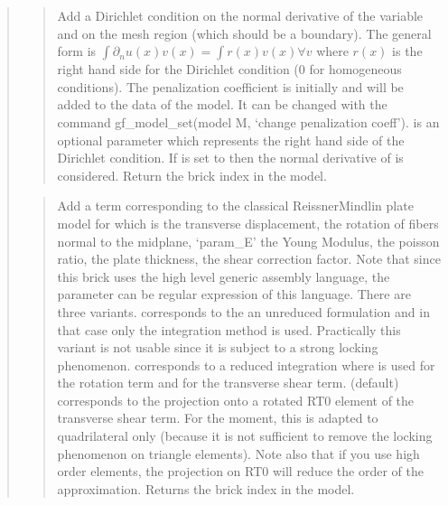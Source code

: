\documentclass[a4paper,11pt,english]{sphinxmanual}
\begin{document}
\begin{quote}
\begin{quote}
Add a Dirichlet condition on the normal derivative of the variable
 and on the mesh region  (which should be a boundary).
The general form is
\(\int \partial_n u(x)v(x) = \int r(x)v(x) \forall v\)
where \(r(x)\) is
the right hand side for the Dirichlet condition (0 for
homogeneous conditions).
The penalization coefficient
is initially  and will be added to the data of the model.
It can be changed with the command gf\_model\_set(model M, ‘change penalization coeff’).
 is an optional parameter which represents
the right hand side of the Dirichlet condition.
If  is set to  then the normal
derivative of  is considered.
Return the brick index in the model.
\end{quote}

\begin{quote}

Add a term corresponding to the classical Reissner\sphinxhyphen{}Mindlin plate
model for which  is the transverse displacement,
 the rotation of
fibers normal to the midplane, ‘param\_E’ the Young Modulus,
 the poisson ratio,
 the plate thickness,
 the shear correction factor. Note that since this brick
uses the high level generic assembly language, the parameter can
be regular expression of this language.
There are three variants.
 corresponds to the an
unreduced formulation and in that case only the integration
method  is used. Practically this variant is not usable since
it is subject to a strong locking phenomenon.
 corresponds to a reduced integration where  is
used for the rotation term and  for the transverse
shear term.  (default) corresponds to the projection onto
a rotated RT0 element of the transverse shear term. For the moment, this
is adapted to quadrilateral only (because it is not sufficient to
remove the locking phenomenon on triangle elements). Note also that if
you use high order elements, the projection on RT0 will reduce the order
of the approximation.
Returns the brick index in the model.
\end{quote}


\end{quote}
\end{document}
